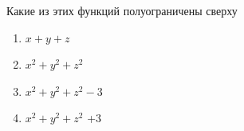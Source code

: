 Какие из этих функций полуограничены сверху

\begin{enumerate}[label=\arabic*)]
    \item \(x+y+z\)
    \item \(x^2+y^2+z^2\)
    \item \(x^2+y^2+z^2-3\)
    \item \(x^2+y^2+z^2\) +3
\end{enumerate}

